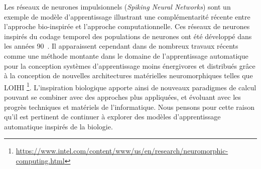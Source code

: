 Les réseaux de neurones impulsionnels (\emph{Spiking Neural Networks}) sont un exemple de modèle d'apprentissage illustrant une complémentarité récente entre l'approche bio-inspirée et l'approche computationnelle. Ces réseaux de neurones inspirés du codage temporel des populations de neurones ont été développé dans les années 90~\parencite{Maass1996NetworksOS}. Il apparaissent cependant dans de nombreux travaux récents comme une méthode montante dans le domaine de l'apprentissage automatique pour la conception systèmes d'apprentissage moins énergivores et distribués grâce à la conception de nouvelles architectures matérielles neuromorphiques telles que LOIHI \footnote{\url{https://www.intel.com/content/www/us/en/research/neuromorphic-computing.html}}.
L'inspiration biologique apporte ainsi de nouveaux paradigmes de calcul pouvant se combiner avec des approches plus appliquées, et évoluant avec les progrès techniques et matériels de l'informatique.
Nous pensons pour cette raison qu'il est pertinent de continuer à explorer des modèles d'apprentissage automatique inspirés de la biologie.

